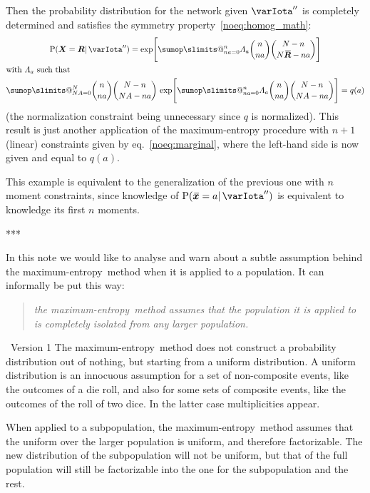 \documentclass{article}
\makeatletter
\theoremstyle{remark}
\theoremstyle{innote}
\def\sum{\DOTSI\sumop\slimits@}
\renewcommand*{\|}{\mathpunct{|}}%
\newcommand*{\p}{\mathrm{P}}%
\newcommand*{\eqn}{eq.}%
\theoremstyle{simple}
\newcommand*{\puzzle}{{\fontencoding{U}\fontfamily{fontawesometwo}\selectfont\symbol{225}}}
\newcommand{\mynote}[1]{ {\color{notecolour}\puzzle\ #1}}
\newcommand*{\widebar}[1]{{\mkern1.5mu\skew{2}\overline{\mkern-1.5mu#1\mkern-1.5mu}\mkern 1.5mu}}
\newcommand*{\av}{\widebar} %
\newcommand*{\sav}{\widebar} %
\newcommand*{\yxx}{x}%
\newcommand*{\yx}{\bm{\yxx}}%
\newcommand*{\yxs}{\sav{\yx}}%
\newcommand*{\yX}{\bm{X}}%
\newcommand*{\yXf}{\av{\yX}}%
\newcommand*{\yR}{\bm{R}}%
\newcommand*{\yRf}{\av{\yR}}%
\newcommand*{\yHb}{\varIota''}
\newcommand*{\yL}{\varLambda}
\newcommand*{\me}{maximum-entropy}
\makeatother
\begin{document}
\medskip Then the probability distribution for the network given $\yHb$ is
completely determined and satisfies the symmetry
property~\eqref{noeq:homog_math}:
\begin{multline}
  \label{noeq:pop_distr_maxent2}
  \p(\yX= \yR \|\yHb) =
\exp\Biggl[
\sum_{n a=0}^n \yL_{ a}
\binom{n}{n a}
\binom{N-n}{N\yRf-n a}\Biggr]
\\
\!\begin{aligned}[b]
&\text{with $\yL_{ a}$ such that}
\\
&\sum_{N A=0}^N 
\binom{n}{n a}
\binom{N-n}{N A-n a}\,
\exp\Biggl[
\sum_{n a=0}^n \yL_{ a}
\binom{n}{n a}
\binom{N-n}{N A-n a}\Biggr]
=q( a)
\end{aligned}
\end{multline}
(the normalization constraint being unnecessary since $q$ is normalized).
This result is just another application of the maximum-entropy procedure
with $n+1$ (linear) constraints given by \eqn~\eqref{noeq:marginal}, where
the left-hand side is now given and equal to $q(a)$.

This example is equivalent to the generalization of the previous one with
$n$ moment constraints, since knowledge of $\p(\yxs=a \| \yHb)$ is
equivalent to knowledge its first $n$ moments.

***



In this note we would like to analyse and warn about a subtle assumption
behind the \me\ method when it is applied to a population. It can informally
be put this way:
\begin{quote}
  \emph{the \me\ method assumes that the population it is applied to is
    completely isolated from any larger population.}
\end{quote}

\mynote{Version 1}
The \me\ method does not construct a probability distribution out of
nothing, but starting from a uniform distribution. A uniform distribution
is an innocuous assumption for a set of non-composite events, like the
outcomes of a die roll, and also for some sets of composite events, like
the outcomes of the roll of two dice. In the latter case multiplicities
appear.

When applied to a subpopulation, the \me\ method assumes that the uniform over
the larger population is uniform, and therefore factorizable. The new
distribution of the subpopulation will not be uniform, but that of the full
population will still be factorizable into the one for the subpopulation and the
rest.
\end{document}
